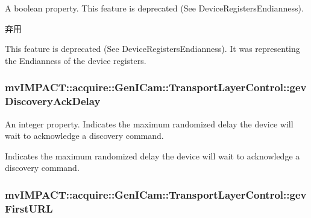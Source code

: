 A boolean property. This feature is deprecated (See Device\+Registers\+Endianness). 

\begin{DoxyRefDesc}{弃用}
\item[\hyperlink{deprecated__deprecated000059}{弃用}]This feature is deprecated (See Device\+Registers\+Endianness). It was representing the Endianness of the device registers. \end{DoxyRefDesc}
\hypertarget{classmv_i_m_p_a_c_t_1_1acquire_1_1_gen_i_cam_1_1_transport_layer_control_a764f47d6ce3db83967b127825b831bb7}{
\subsubsection[{gev\+Discovery\+Ack\+Delay}]{ mv\+I\+M\+P\+A\+C\+T\+::acquire\+::\+Gen\+I\+Cam\+::\+Transport\+Layer\+Control\+::gev\+Discovery\+Ack\+Delay}}\label{classmv_i_m_p_a_c_t_1_1acquire_1_1_gen_i_cam_1_1_transport_layer_control_a764f47d6ce3db83967b127825b831bb7}


An integer property. Indicates the maximum randomized delay the device will wait to acknowledge a discovery command. 

Indicates the maximum randomized delay the device will wait to acknowledge a discovery command. \hypertarget{classmv_i_m_p_a_c_t_1_1acquire_1_1_gen_i_cam_1_1_transport_layer_control_a4ad5abe5d299df7a3216e23dd572305b}{
\subsubsection[{gev\+First\+U\+R\+L}]{ mv\+I\+M\+P\+A\+C\+T\+::acquire\+::\+Gen\+I\+Cam\+::\+Transport\+Layer\+Control\+::gev\+First\+U\+R\+L}}\label{classmv_i_m_p_a_c_t_1_1acquire_1_1_gen_i_cam_1_1_transport_layer_control_a4ad5abe5d299df7a3216e23dd572305b}


